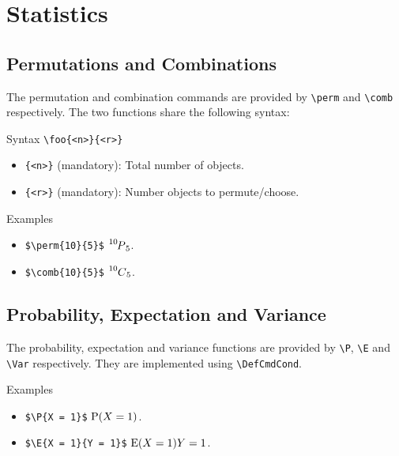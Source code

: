 \section{Statistics}

\subsection{Permutations and Combinations}

The permutation and combination commands are provided by \verb|\perm| and \verb|\comb| respectively. The two functions share the following syntax:

\begin{myframe}{Syntax}
    \verb|\foo{<n>}{<r>}|
    \begin{itemize}
        \item \verb|{<n>}| (mandatory): Total number of objects.
        \item \verb|{<r>}| (mandatory): Number objects to permute/choose.
    \end{itemize}
\end{myframe}

\begin{myframe}{Examples}
    \begin{itemize}
        \item \verb|$\perm{10}{5}$| \produces{} $\prescript{10\mkern-2.5mu}{}P_{5}$.
        \item \verb|$\comb{10}{5}$| \produces{} $\prescript{10\mkern-0.5mu}{}C_{5}$.
    \end{itemize}
\end{myframe}

\subsection{Probability, Expectation and Variance}

The probability, expectation and variance functions are provided by \verb|\P|, \verb|\E| and \verb|\Var| respectively. They are implemented using \verb|\DefCmdCond|.

\begin{myframe}{Examples}
    \begin{itemize}
        \item \verb|$\P{X = 1}$| \produces{} $\P{X = 1}$.
        \item \verb|$\E{X = 1}{Y = 1}$| \produces{} $\E{X = 1}{Y = 1}$.
    \end{itemize}
\end{myframe}

